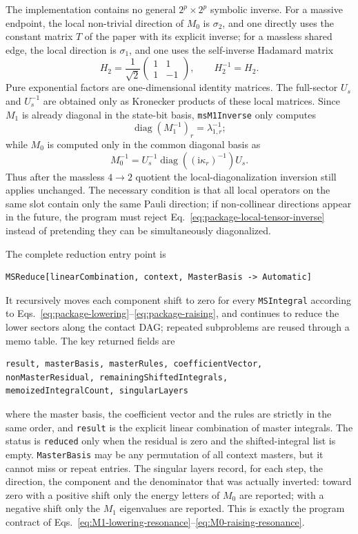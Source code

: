 \documentclass[11pt,a4paper]{article}
\newcommand{\ii}{\mathrm i}
\begin{document}
The implementation contains no general $2^p\times2^p$ symbolic inverse. For a massive endpoint, the local non-trivial direction of $M_0$ is $\sigma_2$, and one directly uses the constant matrix $T$ of the paper with its explicit inverse; for a massless shared edge, the local direction is $\sigma_1$, and one uses the self-inverse Hadamard matrix
\begin{equation}
 H_2=\frac1{\sqrt2}
 \begin{pmatrix}1&1\\1&-1\end{pmatrix},
 \qquad H_2^{-1}=H_2.
 \label{eq:package-hadamard-inverse}
\end{equation}
Pure exponential factors are one-dimensional identity matrices. The full-sector $U_s$ and $U_s^{-1}$ are obtained only as Kronecker products of these local matrices. Since $M_1$ is already diagonal in the state-bit basis, \texttt{msM1Inverse} only computes
\begin{equation}
 \operatorname{diag}(M_1^{-1})_r=\lambda_{1,r}^{-1};
\end{equation}
while $M_0$ is computed only in the common diagonal basis as
\begin{equation}
 M_0^{-1}=U_s^{-1}\operatorname{diag}
 \left((\ii\kappa_r)^{-1}\right)U_s.
 \label{eq:package-local-tensor-inverse}
\end{equation}
Thus after the massless $4\to2$ quotient the local-diagonalization inversion still applies unchanged. The necessary condition is that all local operators on the same slot contain only the same Pauli direction; if non-collinear directions appear in the future, the program must reject Eq.~\eqref{eq:package-local-tensor-inverse} instead of pretending they can be simultaneously diagonalized.

The complete reduction entry point is
\begin{verbatim}
MSReduce[linearCombination, context, MasterBasis -> Automatic]
\end{verbatim}
It recursively moves each component shift to zero for every \texttt{MSIntegral} according to Eqs.~\eqref{eq:package-lowering}--\eqref{eq:package-raising}, and continues to reduce the lower sectors along the contact DAG; repeated subproblems are reused through a memo table. The key returned fields are
\begin{verbatim}
result, masterBasis, masterRules, coefficientVector,
nonMasterResidual, remainingShiftedIntegrals,
memoizedIntegralCount, singularLayers
\end{verbatim}
where the master basis, the coefficient vector and the rules are strictly in the same order, and \texttt{result} is the explicit linear combination of master integrals. The status is \texttt{reduced} only when the residual is zero and the shifted-integral list is empty. \texttt{MasterBasis} may be any permutation of all context masters, but it cannot miss or repeat entries. The singular layers record, for each step, the direction, the component and the denominator that was actually inverted: toward zero with a positive shift only the energy letters of $M_0$ are reported; with a negative shift only the $M_1$ eigenvalues are reported. This is exactly the program contract of Eqs.~\eqref{eq:M1-lowering-resonance}--\eqref{eq:M0-raising-resonance}.
\end{document}
